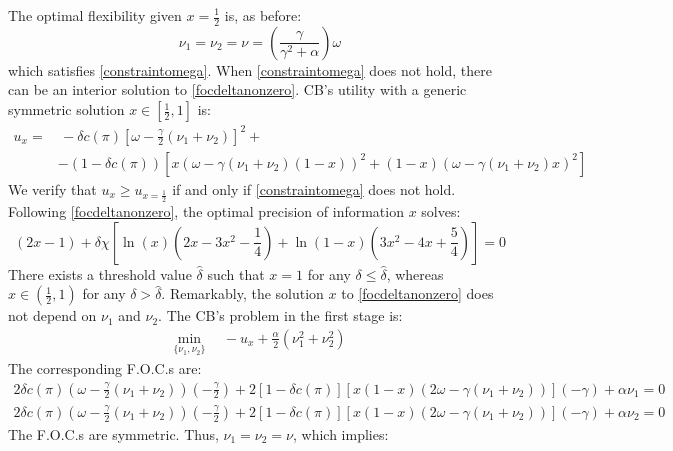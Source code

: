 \documentclass[12pt,a4paper]{article}
\begin{document}
The optimal flexibility given $x=\frac{1}{2}$ is, as before:
\begin{equation}
\label{optflex}
    \nu_1=\nu_2=\nu=\left(\frac{\gamma}{\gamma^2+\alpha}\right)\omega
\end{equation}
which satisfies \eqref{constraintomega}. When \eqref{constraintomega} does not hold, there can be an interior solution to \eqref{focdeltanonzero}. CB's utility with a generic symmetric solution $x\in\left[\frac{1}{2},1\right]$ is:
\begin{equation}
    \begin{split}
        u_{x}= & \, -\delta c(\pi)\left[\omega-\frac{\gamma}{2}(\nu_1+\nu_2)\right]^2+\\
        & -(1-\delta c(\pi))\left[x(\omega-\gamma(\nu_1+\nu_2)(1-x))^2+(1-x)(\omega-\gamma(\nu_1+\nu_2)x)^2\right]
    \end{split}
\end{equation}
We verify that $u_x\geq u_{x=\frac{1}{2}}$ if and only if \eqref{constraintomega} does not hold. Following \eqref{focdeltanonzero}, the optimal precision of information $x$ solves:
\begin{equation}
    [1-\delta\chi\ln(2)](2x-1)+\delta\chi \left[\ln(x)\left(2x-3x^2-\frac{1}{4}\right)+\ln(1-x)\left(3x^2-4x+\frac{5}{4}\right)\right]=0
\end{equation}
There exists a threshold value $\hat{\delta}$ such that $x=1$ for any $\delta\leq \hat{\delta}$, whereas $x\in\left(\frac{1}{2},1\right)$ for any $\delta>\hat{\delta}$. Remarkably, the solution $x$ to \eqref{focdeltanonzero} does not depend on $\nu_1$ and $\nu_2$. The CB's problem in the first stage is:
\begin{equation}
    \begin{split}
    \min_{\{\nu_1,\nu_2\}} \ & \ -u_x
    +\frac{\alpha}{2}(\nu_1^2+\nu_2^2)
    \end{split}
\end{equation}
The corresponding F.O.C.s are:
\begin{eqnarray}
2\delta c(\pi)\left(\omega-\frac{\gamma}{2}(\nu_1+\nu_2)\right)\left(-\frac{\gamma}{2}\right)+2[1-\delta c(\pi)]\left[x(1-x)(2\omega-\gamma(\nu_1+\nu_2))\right](-\gamma)+\alpha \nu_1=0\\
2\delta c(\pi)\left(\omega-\frac{\gamma}{2}(\nu_1+\nu_2)\right)\left(-\frac{\gamma}{2}\right)+2[1-\delta c(\pi)]\left[x(1-x)(2\omega-\gamma(\nu_1+\nu_2))\right](-\gamma)+\alpha \nu_2=0
\end{eqnarray}
The F.O.C.s are symmetric. Thus, $\nu_1=\nu_2=\nu$, which implies:
\end{document}
